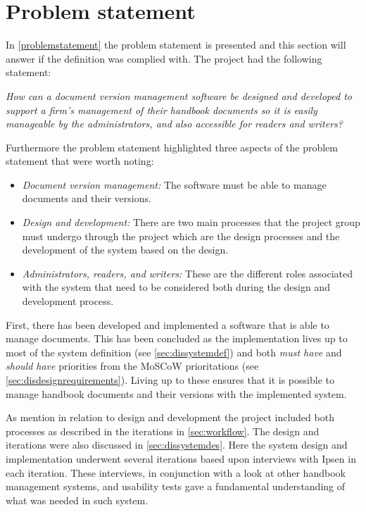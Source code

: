 \section{Problem statement}
In \cref{problemstatement} the problem statement is presented and this section will answer if the definition was complied with.
The project had the following statement:

\begin{center}
\textit{How can a document version management software be designed and developed to support a firm's management of their handbook documents so it is easily manageable by the administrators, and also accessible for readers and writers?}
\end{center}

Furthermore the problem statement highlighted three aspects of the problem statement that were worth noting:

\begin{itemize}
	\item
		\textit{Document version management:}
		The software must be able to manage documents and their versions.
	\item
		\textit{Design and development:}
		There are two main processes that the project group must undergo through the project which are the design processes and the development of the system based on the design.
	\item
		\textit{Administrators, readers, and writers:}
		These are the different roles associated with the system that need to be considered both during the design and development process.

\end{itemize}

First, there has been developed and implemented a software that is able to manage documents.
This has been concluded as the implementation lives up to most of the system definition (see \cref{sec:dissystemdef}) and both \textit{must have} and \textit{should have} priorities from the MoSCoW prioritations (see \cref{sec:disdesignrequirements}).
Living up to these ensures that it is possible to manage handbook documents and their versions with the implemented system.

As mention in relation to design and development the project included both processes as described in the iterations in \cref{sec:workflow}.
The design and iterations were also discussed in {\color{red}\cref{sec:dissystemdes}}.
Here the system design and implementation underwent several iterations based upon interviews with Ipsen in each iteration.
These interviews, in conjunction with a look at other handbook management systems, and usability tests gave a fundamental understanding of what was needed in such system.

